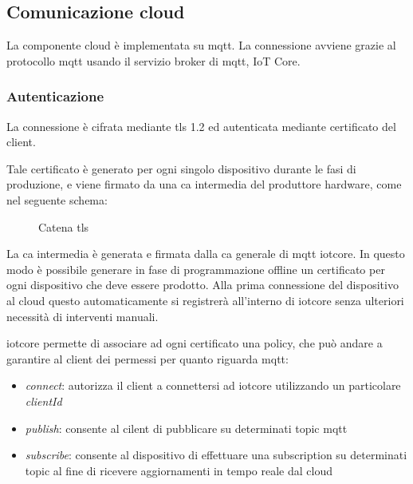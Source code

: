 \documentclass[12pt,a4paper,twoside,titlepage]{book}
\begin{document}
\subsection{Comunicazione cloud}

La componente cloud è implementata su \Gls{mqtt}. La connessione avviene grazie al protocollo
\Gls{mqtt} usando il servizio broker di \Gls{mqtt}, IoT Core.

\subsubsection{Autenticazione}
La connessione è cifrata mediante \gls{tls} 1.2 ed autenticata mediante certificato del client.

Tale certificato è generato per ogni singolo dispositivo durante le fasi di produzione,
e viene firmato da una \acrfull{ca} intermedia del produttore hardware, come nel seguente schema:

\begin{figure}[ht]
    \centering
    \caption{Catena \gls{tls}}
    \label{fig:tls-chain}
\end{figure}

La \acrshort{ca} intermedia è generata e firmata dalla  \acrshort{ca} generale di \Gls{mqtt} \Gls{iotcore}. In questo
modo è possibile generare in fase di programmazione offline un certificato per ogni
dispositivo che deve essere prodotto. Alla prima connessione del dispositivo al \gls{cloud} questo
automaticamente si registrerà all'interno di \Gls{iotcore} senza ulteriori necessità di interventi manuali.

\Gls{iotcore} permette di associare ad ogni certificato una policy, che può andare a garantire al
client dei permessi per quanto riguarda \Gls{mqtt}:
\begin{itemize}
    \item \textit{connect}: autorizza il client a connettersi ad \Gls{iotcore} utilizzando un particolare
        \textit{clientId}
    \item \textit{publish}: consente al cilent di pubblicare su determinati \gls{topic} \Gls{mqtt}
    \item \textit{subscribe}: consente al dispositivo di effettuare una subscription su determinati \gls{topic}
        al fine di ricevere aggiornamenti in tempo reale dal \gls{cloud}
\end{itemize}
\end{document}
